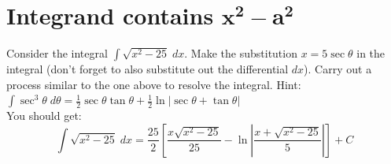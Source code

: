 \documentclass[12pt,letterpaper,fleqn]{article}
\theoremstyle{definition}
\begin{document}
\section*{Integrand contains $\pmb{x^2 - a^2}$}
Consider the integral $\int\sqrt{x^2 - 25}\;dx$. Make the substitution $x = 5\sec\theta$ in the integral (don't forget to also substitute out the differential $dx$). Carry out a process similar to the one above to resolve the integral. Hint: $\int\sec^3\theta\;d\theta = \frac{1}{2}\sec\theta \tan\theta + \frac{1}{2}\ln|\sec\theta + \tan\theta|$\\[1.5ex] You should get:
\begin{equation*}
  \int\sqrt{x^2 - 25}\;dx = \frac{25}{2}\left[\frac{x\sqrt{x^2-25}}{25} - \ln\left|\frac{x + \sqrt{x^2-25}}{5}\right|\right] + C
\end{equation*}
\end{document}
